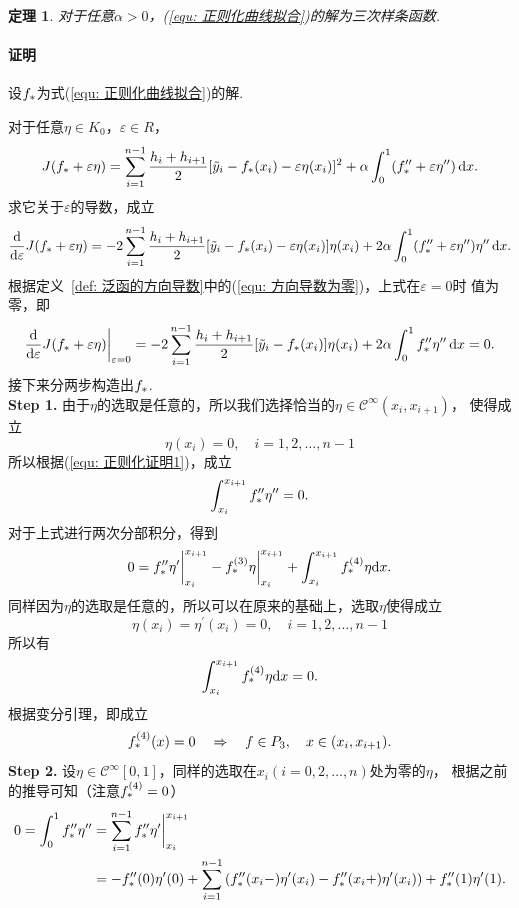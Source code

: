 \documentclass[12pt, a4paper]{article}
\theoremstyle{margin}
\newtheorem{thm}{定理}
\newcommand{\pr}{\prime}
\newcommand{\hp}{^\prime}
\newcommand{\ms}{\mathscr}
\newcommand{\tbf}{\textbf}
\newcommand{\f}{\mathnormal{f}}
\newcommand{\rd}{\mathrm{d}}
\newcommand{\vep}{\varepsilon}
\newcommand\defref[1]{定义~\ref{#1}}
\newcommand\equref[1]{(\ref{#1})}
\newcommand{\proof}{\paragraph{证明}}
\begin{document}
  \begin{thm}
    对于任意$\alpha>0$，\equref{equ: 正则化曲线拟合}的解为三次样条函数.
  \end{thm}
  \proof
    设$\f_*$为式\equref{equ: 正则化曲线拟合}的解. \par
    对于任意$\eta\in K_0$，$\vep\in R$，
    \[
      J(\f_*+\vep\eta) = \sum_{i=1}^{n-1}\frac{h_i + h_{i+1}}{2}
      [\tilde{y}_i - f_*(x_i) - \vep\eta(x_i)]^2 + \alpha
      \int_0^1(\f_*^{\pr\pr} + \vep\eta^{\pr\pr})\,\rd x.
    \]
    求它关于$\vep$的导数，成立
    \[
      \frac{\rd}{\rd\vep}J(\f_*+\vep\eta) =
      -2\sum_{i=1}^{n-1}\frac{h_i+h_{i+1}}{2}[\tilde{y}_i-\f_*(x_i)-\vep\eta(x_i)]\eta(x_i)
      +2\alpha\int_0^1 (\f_*^{\pr\pr}+\vep\eta^{\pr\pr})\eta^{\pr\pr} \,\rd x.
    \]
    根据\defref{def: 泛函的方向导数}中的\equref{equ: 方向导数为零}，上式在$\vep=0$时
    值为零，即
    \begin{equation}
      \label{equ: 正则化证明1}
      \frac{\rd}{\rd\vep}J(\f_*+\vep\eta)\bigg|_{\vep=0} =
      -2\sum_{i=1}^{n-1}\frac{h_i+h_{i+1}}{2}[\tilde{y}_i-\f_*(x_i)]\eta(x_i)
      +2\alpha\int_0^1\f_*^{\pr\pr}\eta^{\pr\pr}\,\rd x = 0.
    \end{equation}
    接下来分两步构造出$\f_*$.\\
    \tbf{Step 1. }
    由于$\eta$的选取是任意的，所以我们选择恰当的$\eta\in\ms{C}^\infty(x_i,x_{i+1})$，
    使得成立
    \[
      \eta(x_i) = 0,\quad i = 1,2,\dots,n-1
    \]
    所以根据\equref{equ: 正则化证明1}，成立
    \[
      \int_{x_i}^{x_{i+1}}\f_*^{\pr\pr}\eta^{\pr\pr} = 0.
    \]
    对于上式进行两次分部积分，得到
    \[
      0 = \f_*^{\pr\pr}\eta\hp\bigg|_{x_i}^{x_{i+1}} -
      \f_*^{(3)}\eta\bigg|_{x_i}^{x_{i+1}} +
      \int_{x_i}^{x_{i+1}}\f_*^{(4)}\eta\rd x.
    \]
    同样因为$\eta$的选取是任意的，所以可以在原来的基础上，选取$\eta$使得成立
    \[
      \eta(x_i) = \eta\hp(x_i) = 0,\quad i = 1,2,\dots,n-1
    \]
    所以有
    \[
      \int_{x_i}^{x_{i+1}}\f_*^{(4)}\eta\rd x = 0.
    \]
    根据变分引理，即成立
    \begin{equation}
      \label{equ: 正则化证明2}
      \f_*^{(4)}(x) = 0\quad\Rightarrow\quad \f\in P_3,\quad x\in(x_i,x_{i+1}).
    \end{equation}
    \tbf{Step 2. }
    设$\eta\in\ms{C}^\infty[0, 1]$，同样的选取在$x_i(i=0,2,\dots,n)$处为零的$\eta$，
    根据之前的推导可知（注意$\f_*^{(4)} = 0$）
    \[\begin{split}
      0 = \int_0^1\f_*^{\pr\pr}\eta^{\pr\pr}
      &= \sum_{i=1}^{n-1} \f_*^{\pr\pr}\eta\hp\bigg|_{x_i}^{x_{i+1}}\\
      &= -\f_*^{\pr\pr}(0)\eta\hp(0) +
         \sum_{i=1}^{n-1}\left( \f_*^{\pr\pr}(x_i-)\eta\hp(x_i) - \f_*^{\pr\pr}(x_i+)\eta\hp(x_i) \right)
         + \f_*^{\pr\pr}(1)\eta\hp(1).
    \end{split}\]
\end{document}
